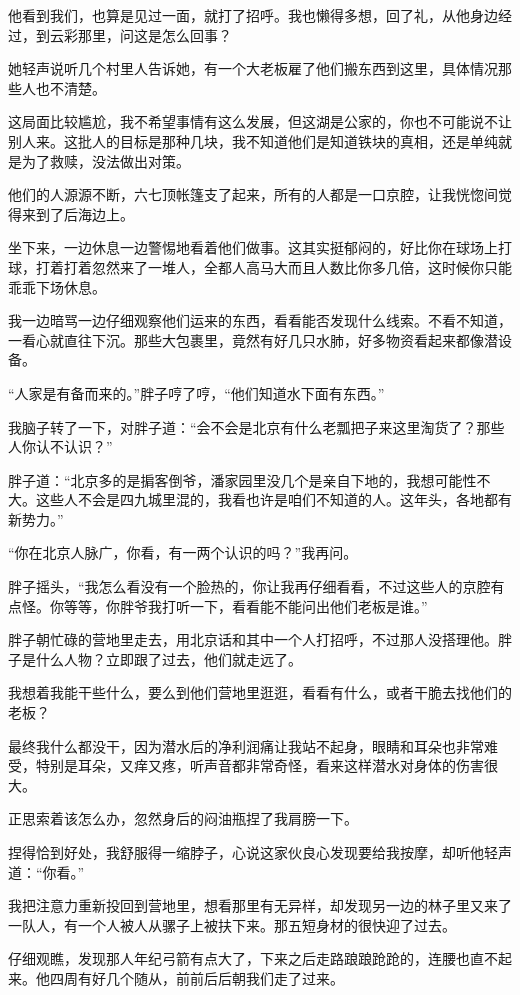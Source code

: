 他看到我们，也算是见过一面，就打了招呼。我也懒得多想，回了礼，从他身边经过，到云彩那里，问这是怎么回事？

她轻声说听几个村里人告诉她，有一个大老板雇了他们搬东西到这里，具体情况那些人也不清楚。

这局面比较尴尬，我不希望事情有这么发展，但这湖是公家的，你也不可能说不让别人来。这批人的目标是那种几块，我不知道他们是知道铁块的真相，还是单纯就是为了救赎，没法做出对策。

他们的人源源不断，六七顶帐篷支了起来，所有的人都是一口京腔，让我恍惚间觉得来到了后海边上。

坐下来，一边休息一边警惕地看着他们做事。这其实挺郁闷的，好比你在球场上打球，打着打着忽然来了一堆人，全都人高马大而且人数比你多几倍，这时候你只能乖乖下场休息。

我一边暗骂一边仔细观察他们运来的东西，看看能否发现什么线索。不看不知道，一看心就直往下沉。那些大包裹里，竟然有好几只水肺，好多物资看起来都像潜设备。

“人家是有备而来的。”胖子哼了哼，“他们知道水下面有东西。”

我脑子转了一下，对胖子道：“会不会是北京有什么老瓢把子来这里淘货了？那些人你认不认识？”

胖子道：“北京多的是掮客倒爷，潘家园里没几个是亲自下地的，我想可能性不大。这些人不会是四九城里混的，我看也许是咱们不知道的人。这年头，各地都有新势力。”

“你在北京人脉广，你看，有一两个认识的吗？”我再问。

胖子摇头，“我怎么看没有一个脸热的，你让我再仔细看看，不过这些人的京腔有点怪。你等等，你胖爷我打听一下，看看能不能问出他们老板是谁。”

胖子朝忙碌的营地里走去，用北京话和其中一个人打招呼，不过那人没搭理他。胖子是什么人物？立即跟了过去，他们就走远了。

我想着我能干些什么，要么到他们营地里逛逛，看看有什么，或者干脆去找他们的老板？

最终我什么都没干，因为潜水后的净利润痛让我站不起身，眼睛和耳朵也非常难受，特别是耳朵，又痒又疼，听声音都非常奇怪，看来这样潜水对身体的伤害很大。

正思索着该怎么办，忽然身后的闷油瓶捏了我肩膀一下。

捏得恰到好处，我舒服得一缩脖子，心说这家伙良心发现要给我按摩，却听他轻声道：“你看。”

我把注意力重新投回到营地里，想看那里有无异样，却发现另一边的林子里又来了一队人，有一个人被人从骡子上被扶下来。那五短身材的很快迎了过去。

仔细观瞧，发现那人年纪弓箭有点大了，下来之后走路踉踉跄跄的，连腰也直不起来。他四周有好几个随从，前前后后朝我们走了过来。

